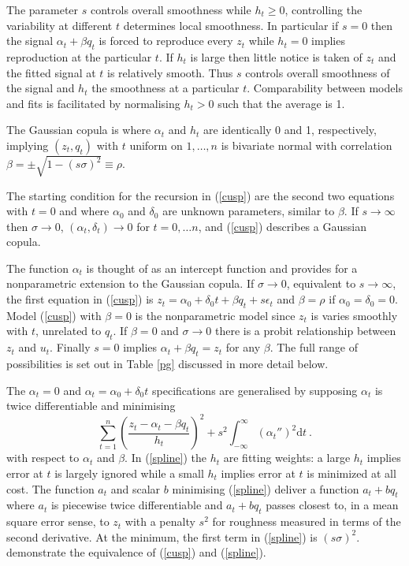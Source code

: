 \documentclass[authoryear]{elsarticle}
\newcommand{\eps}{\epsilon}
\newcommand{\de}{\mathrm{d}}
\newcommand{\eref}[1]{(\ref{#1})}
\newcommand{\tref}[1]{Table \ref{#1}}
\newcommand{\be}[1]{\begin{equation}\label{#1}}
\newcommand{\ee}{\end{equation}}
\begin{document}
The parameter $s$ controls overall smoothness while  $h_t\ge 0$,  controlling the variability at different $t$ determines local smoothness.
In particular if $s=0$ then the signal $\alpha_t+\beta q_t$ is forced to reproduce every  $z_t$ while $h_t=0$ implies reproduction at the particular $t$.     If $h_t$ is large then little notice is taken of $z_t$ and the fitted signal at $t$ is relatively smooth.  Thus $s$ controls overall smoothness of the signal and  $h_t$ the smoothness at a particular $t$.  Comparability between models and fits is facilitated by normalising $h_t>0$ such that the average  is 1.  


The Gaussian copula is where $\alpha_t$ and $h_t$ are  identically 0 and  1, respectively, implying  $(z_t,q_t)$ with $t$ uniform on $1,\ldots,n$  is bivariate normal  with correlation $\beta=\pm\sqrt{1-(s\sigma)^2}\equiv\rho$.    

The starting condition for the recursion in \eref{cusp} are the second two equations with $t=0$ and where $\alpha_0$ and $\delta_0$ are  unknown parameters, similar to $\beta$. If $s\rightarrow\infty$ then $\sigma\rightarrow 0$,  $(\alpha_t,\delta_t)\rightarrow 0$ for $t=0,\ldots n$, and \eref{cusp} describes a Gaussian copula.  

The function $\alpha_t$ is thought of as an intercept function and provides for a nonparametric extension to the Gaussian copula.  If $\sigma\rightarrow 0$, equivalent to $s\rightarrow\infty$,  the first equation in \eref{cusp} is
$
z_t = \alpha_0+\delta_0 t + \beta q_t + s\eps_t
$
and  $\beta=\rho$ if $\alpha_0=\delta_0=0$.    Model \eref{cusp} with  $\beta=0$ is the  nonparametric model since $z_t$ is varies smoothly with $t$, unrelated to $q_t$.  If $\beta=0$ and $\sigma\rightarrow 0$ there is a probit relationship between $z_t$ and $u_t$.  Finally $s=0$ implies $\alpha_t+\beta q_t=z_t$ for any $\beta$.   The full range of possibilities is set out in \tref{pg} discussed in more detail below.  

The $\alpha_t=0$ and $\alpha_t=\alpha_0+\delta_0 t$ specifications are generalised by supposing $\alpha_t$ is twice differentiable and minimising
\be{spline}
 \sum_{t=1}^n\left(\frac{z_t-\alpha_t-\beta q_t}{h_t}\right)^2 + s^2\int_{-\infty}^{\infty} \left(\alpha_t''\right)^2\de t\ .
\ee
with respect to $\alpha_t$ and $\beta$.
 In \eref{spline} the $h_t$  are fitting weights: a large  $h_t$ implies  error at $t$ is largely ignored while a small $h_t$ implies  error at $t$ is  minimized at all cost.  The function $a_t$ and scalar $b$ minimising \eref{spline} deliver a function $a_t+bq_t$ where $a_t$ is piecewise twice differentiable and $a_t+bq_t$ passes closest to, in a mean square error sense, to $z_t$  with a penalty $s^2$ for  roughness measured in terms of the second derivative.   At the minimum, the first term in \eref{spline} is $(s\sigma)^2$.   \cite{Brown&DeJong:2001} demonstrate the equivalence of \eref{cusp} and \eref{spline}.
\end{document}
